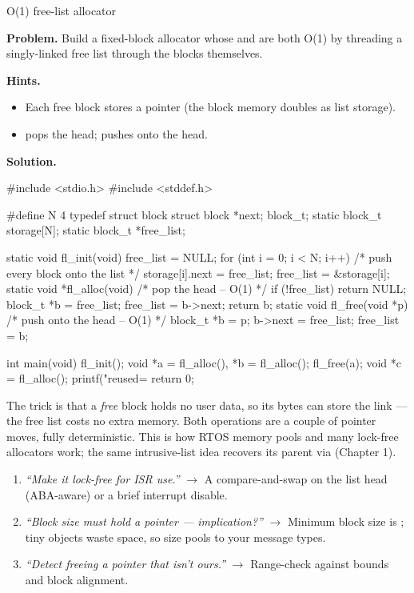 \begin{gymproblem}{O(1) free-list allocator}

\textbf{Problem.} Build a fixed-block allocator whose  and
 are both O(1) by threading a singly-linked free list through the
blocks themselves.

\textbf{Hints.}
\begin{itemize}
\item Each free block stores a  pointer (the block memory doubles as
  list storage).
\item {} pops the head;  pushes onto the head.
\end{itemize}

\attempt

\textbf{Solution.}
\begin{cgym}
#include <stdio.h>
#include <stddef.h>

#define N 4
typedef struct block { struct block *next; } block_t;
static block_t  storage[N];
static block_t *free_list;

static void fl_init(void) {
    free_list = NULL;
    for (int i = 0; i < N; i++) {        /* push every block onto the list */
        storage[i].next = free_list;
        free_list = &storage[i];
    }
}
static void *fl_alloc(void) {            /* pop the head -- O(1) */
    if (!free_list) return NULL;
    block_t *b = free_list;
    free_list = b->next;
    return b;
}
static void fl_free(void *p) {           /* push onto the head -- O(1) */
    block_t *b = p;
    b->next = free_list;
    free_list = b;
}

int main(void) {
    fl_init();
    void *a = fl_alloc(), *b = fl_alloc();
    fl_free(a);
    void *c = fl_alloc();
    printf("reused=%
    return 0;
}
\end{cgym}

The trick is that a \emph{free} block holds no user data, so its bytes can store
the  link --- the free list costs no extra memory. Both operations
are a couple of pointer moves, fully deterministic. This is how RTOS memory
pools and many lock-free allocators work; the same intrusive-list idea recovers
its parent via  (Chapter 1).

\followups
\begin{enumerate}
\item \emph{``Make it lock-free for ISR use.''} $\rightarrow$ A compare-and-swap
  on the list head (ABA-aware) or a brief interrupt disable.
\item \emph{``Block size must hold a pointer --- implication?''} $\rightarrow$
  Minimum block size is ; tiny objects waste space, so size
  pools to your message types.
\item \emph{``Detect freeing a pointer that isn't ours.''} $\rightarrow$
  Range-check  against  bounds and block alignment.
\end{enumerate}
\end{gymproblem}

